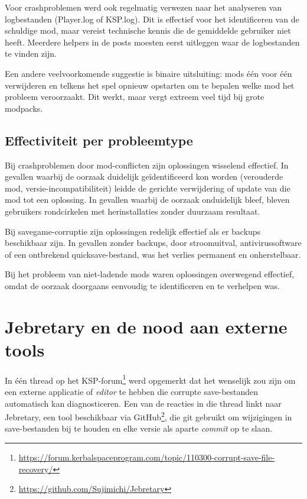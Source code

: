 Voor crashproblemen werd ook regelmatig verwezen naar het analyseren van logbestanden (Player.log of KSP.log). Dit is effectief voor het identificeren van de schuldige mod, maar vereist technische kennis die de gemiddelde gebruiker niet heeft. Meerdere helpers in de posts moesten eerst uitleggen waar de logbestanden te vinden zijn.

Een andere veelvoorkomende suggestie is binaire uitsluiting: mods één voor één verwijderen en telkens het spel opnieuw opstarten om te bepalen welke mod het probleem veroorzaakt. Dit werkt, maar vergt extreem veel tijd bij grote modpacks.

\subsection{Effectiviteit per probleemtype}

Bij crashproblemen door mod-conflicten zijn oplossingen wisselend effectief. In gevallen waarbij de oorzaak duidelijk geïdentificeerd kon worden (verouderde mod, versie-incompatibiliteit) leidde de gerichte verwijdering of update van die mod tot een oplossing. In gevallen waarbij de oorzaak onduidelijk bleef, bleven gebruikers rondcirkelen met herinstallaties zonder duurzaam resultaat.

Bij savegame-corruptie zijn oplossingen redelijk effectief als er backups beschikbaar zijn. In gevallen zonder backups, door stroomuitval, antivirussoftware of een ontbrekend quicksave-bestand, was het verlies permanent en onherstelbaar.

Bij het probleem van niet-ladende mods waren oplossingen overwegend effectief, omdat de oorzaak doorgaans eenvoudig te identificeren en te verhelpen was.

\section{Jebretary en de nood aan externe tools}

In één thread op het KSP-forum\footnote{\url{https://forum.kerbalspaceprogram.com/topic/110300-corrupt-save-file-recovery/}} werd opgemerkt dat het wenselijk zou zijn om een externe applicatie of \textit{editor} te hebben die corrupte save-bestanden automatisch kan diagnosticeren. Een van de reacties in die thread linkt naar Jebretary, een tool beschikbaar via GitHub\footnote{\url{https://github.com/Sujimichi/Jebretary}}, die git gebruikt om wijzigingen in save-bestanden bij te houden en elke versie als aparte \textit{commit} op te slaan.

